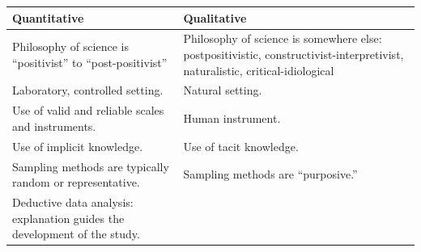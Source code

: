 \documentclass[
  english,
]{book}
\begin{document}
\begin{longtable}[]{@{}ll@{}}
\toprule
\begin{minipage}[b]{0.47\columnwidth}\raggedright
\textbf{Quantitative}\strut
\end{minipage} & \begin{minipage}[b]{0.47\columnwidth}\raggedright
\textbf{Qualitative}\strut
\end{minipage}\tabularnewline
\midrule
\endhead
\begin{minipage}[t]{0.47\columnwidth}\raggedright
Philosophy of science is ``positivist'' to ``post-positivist''\strut
\end{minipage} & \begin{minipage}[t]{0.47\columnwidth}\raggedright
Philosophy of science is somewhere else: postpositivistic, constructivist-interpretivist, naturalistic, critical-idiological\strut
\end{minipage}\tabularnewline
\begin{minipage}[t]{0.47\columnwidth}\raggedright
Laboratory, controlled setting.\strut
\end{minipage} & \begin{minipage}[t]{0.47\columnwidth}\raggedright
Natural setting.\strut
\end{minipage}\tabularnewline
\begin{minipage}[t]{0.47\columnwidth}\raggedright
Use of valid and reliable scales and instruments.\strut
\end{minipage} & \begin{minipage}[t]{0.47\columnwidth}\raggedright
Human instrument.\strut
\end{minipage}\tabularnewline
\begin{minipage}[t]{0.47\columnwidth}\raggedright
Use of implicit knowledge.\strut
\end{minipage} & \begin{minipage}[t]{0.47\columnwidth}\raggedright
Use of tacit knowledge.\strut
\end{minipage}\tabularnewline
\begin{minipage}[t]{0.47\columnwidth}\raggedright
Sampling methods are typically random or representative.\strut
\end{minipage} & \begin{minipage}[t]{0.47\columnwidth}\raggedright
Sampling methods are ``purposive.''\strut
\end{minipage}\tabularnewline
\begin{minipage}[t]{0.47\columnwidth}\raggedright
Deductive data analysis: explanation guides the development of the study.\strut

\end{minipage}
\end{longtable}
\end{document}
